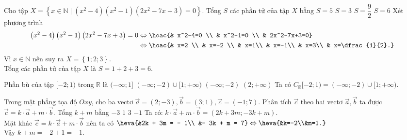 \begin{ex}%
	Cho tập $X=\left\{x\in\mathbb{N}\mid\left(x^2-4\right)\left(x^2-1\right)\left(2x^2-7x+3\right)=0\right\}$. Tổng $S$ các phần tử của tập $X$ bằng 
	\choice 
	{$S=5$}
	{$S=3$}
	{$S=\dfrac{9}{2}$}
	{\True $S=6$}
	\loigiai 
	{
		Xét phương trình
		\begin{align*}
			\left(x^2-4\right)\left(x^2-1\right)\left(2x^2-7x+3\right)=0&\Leftrightarrow\hoac{& x^2-4=0 \\ & x^2-1=0 \\ & 2x^2-7x+3=0}\\
			&\Leftrightarrow \hoac{& x=2 \\ & x=-2 \\ & x=1\\ & x=-1\\ & x=3\\ & x=\dfrac{1}{2}.}
		\end{align*}
		Vì $x\in \mathbb{N}$ nên suy ra $X=\left\{1;2;3\right\}$.\\
		Tổng các phần tử của tập $X$ là $S=1+2+3=6$.
	}
\end{ex}

\begin{ex}%
	Phần bù của tập $[-2;1)$ trong $\mathbb{R}$ là 
	\choice 
	{$(-\infty;1]$}
	{\True $(-\infty;-2)\cup[1;+\infty)$}
	{$(-\infty;-2)$}
	{$(2;+\infty)$}
	\loigiai 
	{
		Ta có $C_{\mathbb{R}}[-2;1)=(-\infty;-2)\cup[1;+\infty)$.
	}
\end{ex}

\begin{ex}%
	Trong mặt phẳng tọa độ $Oxy$, cho ba vectơ $\overrightarrow{a}=(2;-3),\overrightarrow{b}=(3;1),\overrightarrow{c}=(-1;7)$. Phân tích $\overrightarrow{c}$ theo hai vectơ $\overrightarrow{a},\overrightarrow{b}$ ta được $\overrightarrow{c}=k\cdot\overrightarrow{a}+m\cdot\overrightarrow{b}$. Tổng $k+m$ bằng 
	\choice 
	{$-3$}
	{$1$}
	{$3$}
	{\True $-1$}
	\loigiai 
	{ Ta có: $k \cdot \vec{a}+m\cdot \vec{b}=\left(2k+3m;-3k+m\right).$ \\
		Mặt khác $\vec{c}=k\cdot \vec{a}+m \cdot \vec{b}$ nên ta có
		$\heva{&2k + 3m =  - 1\\ &- 3k + m = 7}\Leftrightarrow \heva{&k=-2\\&m=1.}$\\
		Vậy $k+m=-2+1=-1$.
	}
\end{ex}

